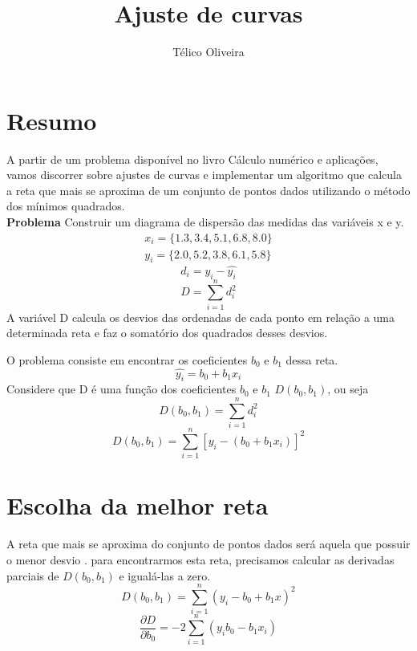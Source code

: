 \documentclass{article}
\title{Ajuste de curvas}
\author{Télico Oliveira}
\begin{document}
\maketitle
\section{Resumo}
A partir de um problema disponível no livro Cálculo numérico e aplicações, vamos discorrer sobre ajustes de curvas e implementar um algoritmo que calcula a reta que mais se aproxima de um conjunto de pontos dados utilizando o método dos mínimos quadrados. 
\\
\textbf{Problema} Construir um diagrama de dispersão das medidas das variáveis x e y. 
\begin{eqnarray*}
    x_i = \{1.3, 3.4, 5.1, 6.8, 8.0 \} \\
    y_i = \{2.0, 5.2, 3.8, 6.1, 5.8 \}
\end{eqnarray*}
\begin{equation}
    d_i = y_i - \hat{y_i}
\end{equation}
\begin{equation}
    D = \sum_{i = 1}^n d_i^2
\end{equation}
A variável D calcula os desvios das ordenadas de cada ponto em relação a uma determinada reta e faz o somatório dos quadrados desses desvios. 

O problema consiste em encontrar os coeficientes $b_0$ e $b_1$ dessa reta. 
\begin{equation}
    \hat{y_i} = b_0 + b_1 x_i
\end{equation}
Considere que D é uma função dos coeficientes $b_0$ e $b_1$ $D(b_0, b_1)$, ou seja
\begin{equation*}
    D(b_0, b_1) = \sum_{i = 1}^n d_i^2
\end{equation*}
\begin{equation*}
    D(b_0, b_1) = \sum_{i = 1}^n \left[ y_i - (b_0 + b_1x_i)\right]^2
\end{equation*}
\section{Escolha da melhor reta}

A reta que mais se aproxima do conjunto de pontos dados será aquela que possuir o menor desvio . para encontrarmos esta reta, precisamos calcular as derivadas parciais de $D(b_0, b_1)$ e igualá-las a zero. 
\begin{equation}
     D(b_0, b_1) = \sum_{i = 1}^n (y_i - b_0 + b_1x)^2
\end{equation}
\begin{equation}
    \frac{\partial D}{\partial b_0} = -2 \sum_{i = 1}^n(y_i b_0 -b_1x_i)
\end{equation}
\end{document}
